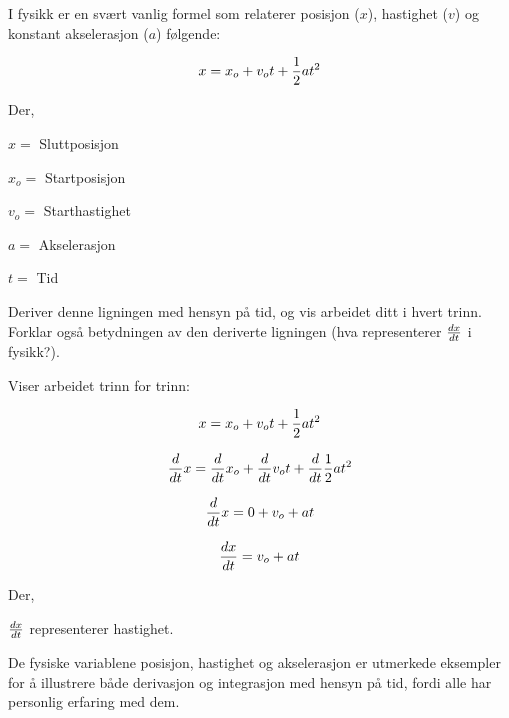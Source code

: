 

I fysikk er en svært vanlig formel som relaterer posisjon ($x$), hastighet ($v$) og konstant akselerasjon ($a$) følgende:

$$x = x_o + v_ot + {1 \over 2}at^2$$

\noindent
Der,

$x =$ Sluttposisjon

$x_o =$ Startposisjon

$v_o =$ Starthastighet

$a =$ Akselerasjon

$t =$ Tid

\vskip 10pt

Deriver denne ligningen med hensyn på tid, og vis arbeidet ditt i hvert trinn. Forklar også betydningen av den deriverte ligningen (hva representerer ${dx \over dt}$ i fysikk?).







Viser arbeidet trinn for trinn:

$$x = x_o + v_ot + {1 \over 2}at^2$$

$${d \over dt}x = {d \over dt}x_o + {d \over dt}v_ot + {d \over dt}{1 \over 2}at^2$$

$${d \over dt}x = 0 + v_o + at$$

$${dx \over dt} = v_o + at$$

\noindent
Der,

${dx \over dt}$ representerer hastighet.







De fysiske variablene posisjon, hastighet og akselerasjon er utmerkede eksempler for å illustrere både derivasjon og integrasjon med hensyn på tid, fordi alle har personlig erfaring med dem.



